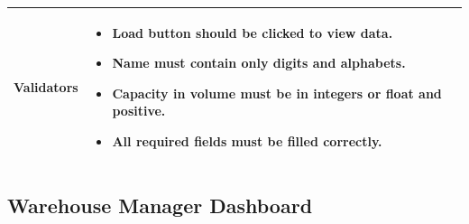 \documentclass[12pt,a4paper]{article}
\begin{document}
\begin{longtable}{| p{3cm}|p{12cm}|}
Validators & 
\begin{itemize}
\item Load button should be clicked to view data.
\item Name must contain only digits and alphabets.
\item Capacity in volume must be in integers or float and positive.
\item All required fields must be filled correctly. 
\end{itemize}
\\ \hline

\end{longtable} 
\subsection{Warehouse Manager Dashboard }
\end{document}
